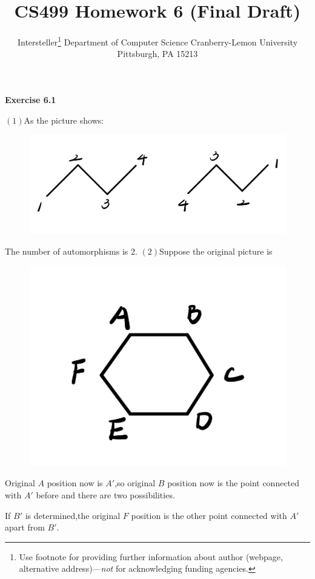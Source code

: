 \documentclass{article} %
\title{CS499 Homework 6 (Final Draft)}
\author{
	Intersteller\thanks{ Use footnote for providing further information
		about author (webpage, alternative address)---\emph{not} for acknowledging
		funding agencies.}
	Department of Computer Science
	Cranberry-Lemon University
	Pittsburgh, PA 15213
}
\begin{document}
	\maketitle
	\textbf{Exercise 6.1}\par

    $(1)$As the picture shows:\par
    \begin{figure}[H]
		\centering
		\includegraphics[scale=0.3]{p31.jpg}
		\caption{}
		\label{fig:1}
	\end{figure}
	The number of automorphisms is 2.
    $(2)$Suppose the original picture is\par
    \begin{figure}[H]
		\centering
		\includegraphics[scale=0.4]{p32.jpg}
		\caption{}
		\label{fig:2}
	\end{figure}
    Original $A$ position now is $A'$,so original $B$ position now is the point connected with $A'$ before and there are two possibilities.\par
    If $B'$ is determined,the original $F$ position is the other point connected with $A'$ apart from $B'$.\par
\end{document}
